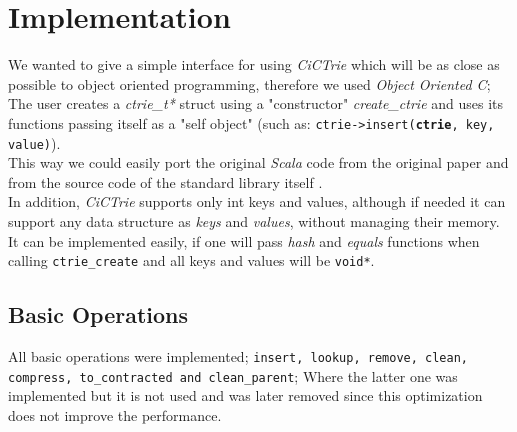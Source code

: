 \documentclass[conference]{IEEEtran}
\begin{document}
\section{Implementation}
	
	We wanted to give a simple interface for using \textit{CiCTrie}\cite{cictrie} which will be as close  as possible to object oriented programming, therefore we used \textit{Object Oriented C}; The user creates a \textit{ctrie\_t*} struct using a "constructor" \textit{create\_ctrie} and uses its functions passing itself as a "self object" (such as: \texttt{ctrie->insert(\textbf{ctrie}, key, value)}). \\
	This way we could easily port the original \textit{Scala} code from the original paper \cite{article} and from the source code of the standard library itself \cite{ctrie-scala-source-code}. \\
	In addition, \textit{CiCTrie} supports only int keys and values, although if needed it can support any data structure as \textit{keys} and \textit{values}, without managing their memory. It can be implemented easily, if one will pass \textit{hash} and \textit{equals} functions when calling \texttt{ctrie\_create} and all keys and values will be \texttt{void*}.
	
\subsection{Basic Operations}
	All basic operations were implemented; \texttt{insert, lookup, remove, clean, compress, to\_contracted and clean\_parent}; Where the latter one was implemented but it is not used and was later removed since this optimization does not improve the performance.
	
\end{document}
